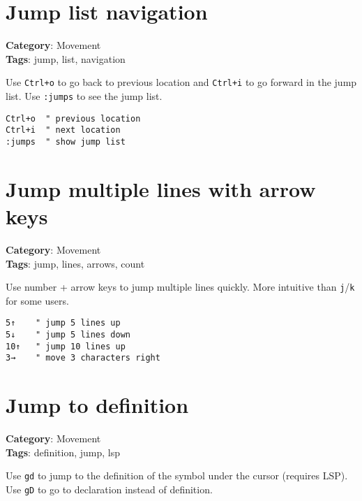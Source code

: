 {{{{{{\section{Jump list navigation}

\textbf{Category}: Movement\\ \textbf{Tags}: jump, list, navigation
\vspace{0.5cm}

Use {\footnotesize \Verb§Ctrl+o§} to go back to previous location and {\footnotesize \Verb§Ctrl+i§} to go forward in the jump list. Use {\footnotesize \Verb§:jumps§} to see the jump list.

\begin{Exa*}{}
\begin{Verbatim}[fontsize=\footnotesize, breaklines, breakanywhere]
Ctrl+o  " previous location
Ctrl+i  " next location
:jumps  " show jump list
\end{Verbatim}
\end{Exa*}

\section{Jump multiple lines with arrow keys}

\textbf{Category}: Movement\\ \textbf{Tags}: jump, lines, arrows, count
\vspace{0.5cm}

Use number + arrow keys to jump multiple lines quickly. More intuitive than {\footnotesize \Verb§j§}/{\footnotesize \Verb§k§} for some users.

\begin{Exa*}{}
\begin{Verbatim}[fontsize=\footnotesize, breaklines, breakanywhere]
5↑    " jump 5 lines up
5↓    " jump 5 lines down
10↑   " jump 10 lines up
3→    " move 3 characters right
\end{Verbatim}
\end{Exa*}

\section{Jump to definition}

\textbf{Category}: Movement\\ \textbf{Tags}: definition, jump, lsp
\vspace{0.5cm}

Use {\footnotesize \Verb§gd§} to jump to the definition of the symbol under the cursor (requires LSP). Use {\footnotesize \Verb§gD§} to go to declaration instead of definition.

}}}}}}
